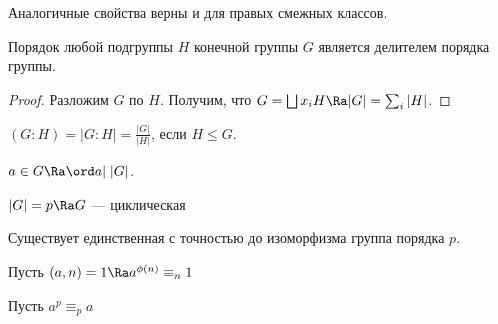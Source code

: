 Аналогичные свойства верны и для правых смежных классов.

\begin{theorem}[Лагранжа]
    Порядок любой подгруппы \(H\) конечной группы \(G\) является делителем порядка группы.
\end{theorem}
\begin{proof}
    Разложим \(G\) по \(H\). Получим, что \(G = \bigsqcup x_i H \Ra |G| = \sum_i |H|\).
\end{proof}

\begin{definition}
    \((G:H) = |G:H| = \frac{|G|}{|H|}\), если \(H \le G\).
\end{definition}

\begin{corollary}
    \(a \in G \Ra \ord a |\;|G|\).
\end{corollary}

\begin{corollary}
    \(|G| = p \Ra G\) --- циклическая
\end{corollary}

\begin{corollary}
    Существует единственная с точностью до изоморфизма группа порядка \(p\).
\end{corollary}

\begin{corollary}
    Пусть \((a, n) = 1 \Ra a^{\phi(n)} \equiv_n 1\)
\end{corollary}

\begin{corollary}
    Пусть \(a^p \equiv_p a\)
\end{corollary}


